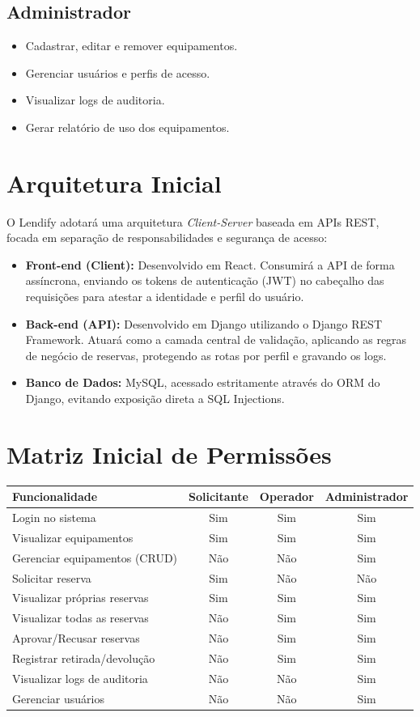 \documentclass[12pt,a4paper]{article}
\begin{document}
\subsection*{Administrador}
\begin{itemize}
    \item Cadastrar, editar e remover equipamentos.
    \item Gerenciar usuários e perfis de acesso.
    \item Visualizar logs de auditoria.
    \item Gerar relatório de uso dos equipamentos.
\end{itemize}

\section*{Arquitetura Inicial}

O Lendify adotará uma arquitetura \textit{Client-Server} baseada em APIs REST, focada em separação de responsabilidades e segurança de acesso:

\begin{itemize}
    \item \textbf{Front-end (Client):} Desenvolvido em React. Consumirá a API de forma assíncrona, enviando os tokens de autenticação (JWT) no cabeçalho das requisições para atestar a identidade e perfil do usuário.
    \item \textbf{Back-end (API):} Desenvolvido em Django utilizando o Django REST Framework. Atuará como a camada central de validação, aplicando as regras de negócio de reservas, protegendo as rotas por perfil e gravando os logs.
    \item \textbf{Banco de Dados:} MySQL, acessado estritamente através do ORM do Django, evitando exposição direta a SQL Injections.
\end{itemize}

\section*{Matriz Inicial de Permissões}

\begin{tabular}{@{}lccc@{}}
\toprule
\textbf{Funcionalidade} & \textbf{Solicitante} & \textbf{Operador} & \textbf{Administrador} \\
\midrule
Login no sistema & Sim & Sim & Sim \\
Visualizar equipamentos & Sim & Sim & Sim \\
Gerenciar equipamentos (CRUD) & Não & Não & Sim \\
Solicitar reserva & Sim & Não & Não \\
Visualizar próprias reservas & Sim & Sim & Sim \\
Visualizar todas as reservas & Não & Sim & Sim \\
Aprovar/Recusar reservas & Não & Sim & Sim \\
Registrar retirada/devolução & Não & Sim & Sim \\
Visualizar logs de auditoria & Não & Não & Sim \\
Gerenciar usuários & Não & Não & Sim \\
\bottomrule
\end{tabular}
\end{document}
